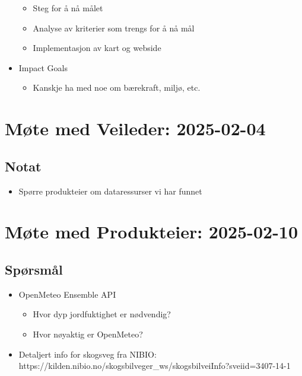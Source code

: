 \begin{itemize}
  \begin{itemize}
  \item
    Steg for å nå målet
  \item
    Analyse av kriterier som trengs for å nå mål
  \item
    Implementasjon av kart og webside
  \end{itemize}
\item
  Impact Goals

  \begin{itemize}
  
  \item
    Kanskje ha med noe om bærekraft, miljø, etc.
  \end{itemize}
\end{itemize}

\section*{Møte med Veileder: 2025-02-04}

\subsection*{Notat}
\begin{itemize}
\item
  Spørre produkteier om dataressurser vi har funnet
\end{itemize}

\section*{Møte med Produkteier: 2025-02-10}

\subsection*{Spørsmål}

\begin{itemize} 
\item
  OpenMeteo Ensemble API

  \begin{itemize}
  \item
    Hvor dyp jordfuktighet er nødvendig?
  \item
    Hvor nøyaktig er OpenMeteo?
  \end{itemize}
\item
  Detaljert info for skogsveg fra NIBIO: \\
  https://kilden.nibio.no/skogsbilveger\_ws/skogsbilveiInfo?sveiid=3407-14-1
\end{itemize}

